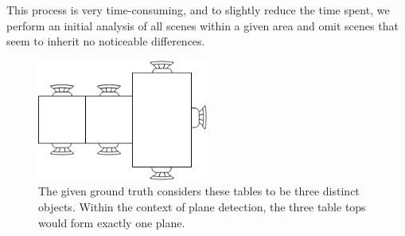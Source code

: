 \documentclass[main.tex]{subfiles}
\begin{document}
This process is very time-consuming, and to slightly reduce the time spent, we perform an initial analysis of all scenes within a 
given area and omit scenes that seem to inherit no noticeable differences.


\begin{figure} [H]
	\centering
	\includegraphics[width=0.5\textwidth]{images/tables.png}
    \caption[Ground Truth Table Example]{The given ground truth considers these tables to be three distinct objects. Within the context of 
    plane detection, the three table tops would form exactly one plane.}
	\label{fig:tables}
\end{figure}
\end{document}
